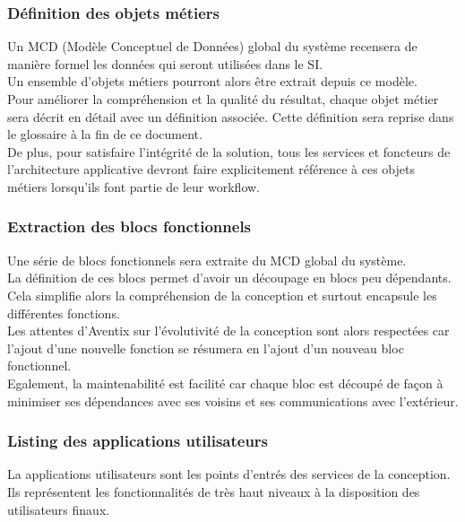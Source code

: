 \subsubsection{Définition des objets métiers}
Un MCD (Modèle Conceptuel de Données) global du système recensera de manière
formel les données qui seront utilisées dans le SI. \\

Un ensemble d'objets métiers pourront alors être extrait depuis ce modèle. \\

Pour améliorer la compréhension et la qualité du résultat, chaque objet métier
sera décrit en détail avec un définition associée. Cette définition sera
reprise dans le glossaire à la fin de ce document. \\

De plus, pour satisfaire l'intégrité de la solution, tous les services et
foncteurs de l'architecture applicative devront faire explicitement référence à
ces objets métiers lorsqu'ils font partie de leur workflow. \\

\subsubsection{Extraction des blocs fonctionnels}
Une série de blocs fonctionnels sera extraite du MCD global du système. \\

La définition de ces blocs permet d'avoir un découpage en blocs peu dépendants.
Cela simplifie alors la compréhension de la conception et surtout encapsule les
différentes fonctions. \\

Les attentes d'Aventix sur l'évolutivité de la conception sont alors respectées
car l'ajout d'une nouvelle fonction se résumera en l'ajout d'un nouveau bloc
fonctionnel. \\

Egalement, la maintenabilité est facilité car chaque bloc est découpé de façon
à minimiser ses dépendances avec ses voisins et ses communications avec
l'extérieur. \\


\subsubsection{Listing des applications utilisateurs}
La applications utilisateurs sont les points d'entrés des services de la
conception. Ils représentent les fonctionnalités de très haut niveaux à la
disposition des utilisateurs finaux. \\

